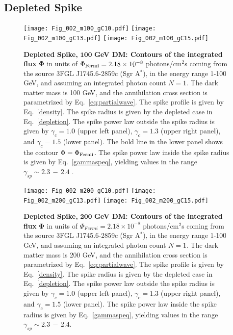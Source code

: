 \documentclass[11pt]{article}
\begin{document}
\subsection{Depleted Spike}


   \begin{figure}[ht]
  \centering
  {\texttt{[image: Fig\_002\_m100\_gC10.pdf]}}\quad
  {\texttt{[image: Fig\_002\_m100\_gC13.pdf]}}\quad 
  {\texttt{[image: Fig\_002\_m100\_gC15.pdf]}}
    \caption{\textbf{Depleted Spike,} $\mathbf{100}$ \textbf{ GeV DM: Contours of the integrated flux} $\mathbf{\Phi}$ in units of $\Phi_{\rm Fermi} = 2.18 \times 10^{-8}$ photons/cm$^2$s coming from the source 3FGL J1745.6-2859c (Sgr A$^*$), in the energy range 1-100 GeV, and assuming an integrated photon count $N=1$. The dark matter mass is 100 GeV, and the annihilation cross section is parametrized by Eq.~\ref{eq:partialwave}. The spike profile is given by Eq.~\ref{density}. The spike radius is given by the depleted case in Eq.~\ref{depletion}. The spike power law  outside the spike radius is given by $\gamma_c  = 1.0$ (upper left panel), $\gamma_c  = 1.3$ (upper right panel), and $\gamma_c  = 1.5$ (lower panel). The bold line in the lower panel shows the contour $\Phi = \Phi_{\rm Fermi}$. The spike power law inside the spike radius is given by Eq.~\ref{gammaspeq}, yielding values in the range $\gamma_{sp} \sim 2.3 \, - \, 2.4$ .}
    \label{coc1resultsm100}
\end{figure}



   \begin{figure}[ht]
  \centering
  {\texttt{[image: Fig\_002\_m200\_gC10.pdf]}}\quad
  {\texttt{[image: Fig\_002\_m200\_gC13.pdf]}}\quad 
  {\texttt{[image: Fig\_002\_m200\_gC15.pdf]}}
    \caption{\textbf{Depleted Spike,} $\mathbf{200}$ \textbf{ GeV DM: Contours of the integrated flux} $\mathbf{\Phi}$ in units of $ \Phi_{Fermi} = 2.18 \times 10^{-8}$ photons/cm$^2$s coming from the source 3FGL J1745.6-2859c (Sgr A$^*$), in the energy range 1-100 GeV, and assuming an integrated photon count $N=1$. The dark matter mass is 200 GeV, and the annihilation cross section is parametrized by Eq.~\ref{eq:partialwave}. The spike profile is given by Eq.~\ref{density}. The spike radius is given by the depleted case in Eq.~\ref{depletion}. The spike power law  outside the spike radius is given by $\gamma_c  = 1.0$ (upper left panel), $\gamma_c  = 1.3$ (upper right panel), and $\gamma_c  = 1.5$ (lower panel). The spike power law inside the spike radius is given by Eq.~\ref{gammaspeq}, yielding values in the range $\gamma_{sp} \sim 2.3 \, - \, 2.4$.}
    \label{coc1resultsm200}
\end{figure}
\end{document}
